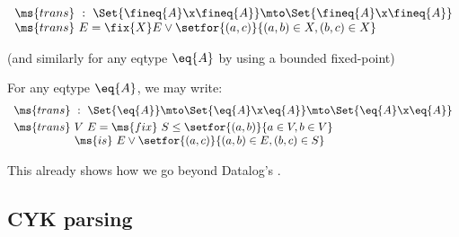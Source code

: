 \documentclass[preprint]{sigplanconf}
\begin{document}
\[\begin{array}{l}
\ms{trans} ~:~ \Set{\fineq{A} \x \fineq{A}} \mto \Set{\fineq{A} \x \fineq{A}}\\
\ms{trans}\ E = \fix{X} E \vee \setfor{(a,c)}{(a,b) \in X, (b,c) \in X}
\end{array}\]

\TODO (and similarly for any eqtype $\eq{A}$ by using a bounded fixed-point)

For any eqtype $\eq{A}$, we may write:
\[\begin{array}{l}
\ms{trans} ~:~
\Set{\eq{A}} \mto \Set{\eq{A} \x \eq{A}} \mto \Set{\eq{A} \x \eq{A}}
\vspace{0.3em}\\
\ms{trans}\ V\ E = \ms{fix}~ S \le \setfor{(a,b)}{a\in V, b \in V}\\
\hspace{5.35em}\ms{is}~ E \vee \setfor{(a,c)}{(a,b) \in E, (b,c) \in S}\\
\end{array}\]

\TODO This already shows how we go beyond Datalog's .

\subsection{CYK parsing}
\end{document}
